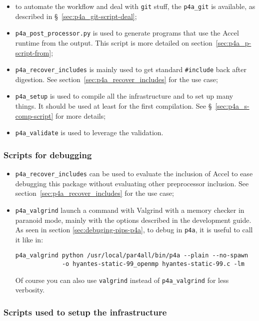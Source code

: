 \documentclass[a4paper]{article}
\begin{document}
\begin{itemize}
\item to automate the \Apfa workflow and deal with \texttt{git} stuff, the
  \verb|p4a_git| is available, as described in
  \S~\ref{sec:p4a_git-script-deal};
\item \verb|p4a_post_processor.py| is used to generate programs that use
  the \Apfa Accel runtime from the \Apips output. This script is more
  detailed on section~\ref{sec:p4a_p-script-from};
\item \verb|p4a_recover_includes| is mainly used to get standard
  \verb|#include| back after \Apips digestion. See
  section~\ref{sec:p4a_recover_includes} for the use case;
\item \verb|p4a_setup| is used to compile all the \Apfa infrastructure and
  to set up many things. It should be used at least for the first
  compilation. See \S~\ref{sec:p4a_s-comp-script} for more details;
\item \verb|p4a_validate| is used to leverage the \Apips validation.
\end{itemize}


\subsubsection{Scripts for debugging}
\label{sec:scripts-debugging}

\begin{itemize}
\item \verb|p4a_recover_includes| can be used to evaluate the inclusion of
  \Apfa Accel to ease debugging this package without evaluating other
  preprocessor inclusion. See section~\ref{sec:p4a_recover_includes} for
  the use case;
\item \verb|p4a_valgrind| launch a command with Valgrind with a memory
  checker in paranoid mode, mainly with the options described in the
  \Apips development guide. As seen in section
  \ref{sec:debuging-pips-p4a}, to debug \Apips in \texttt{p4a}, it is
  useful to call it like in:
\begin{verbatim}
p4a_valgrind python /usr/local/par4all/bin/p4a --plain --no-spawn
             -o hyantes-static-99_openmp hyantes-static-99.c -lm
\end{verbatim}
  Of course you can also use \texttt{valgrind} instead of
  \verb/p4a_valgrind/ for less verbosity.
\end{itemize}


\subsubsection{Scripts used to setup the infrastructure}
\label{sec:scripts-used-setup}
\end{document}
